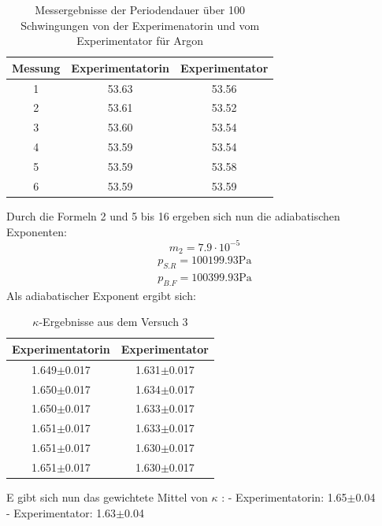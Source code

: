 \documentclass[bibliography=totocnumbered]{scrartcl}
\begin{document}
	\begin{table}[ht!]
		\centering
		\caption{Messergebnisse der Periodendauer über 100 Schwingungen von der Experimenatorin und vom Experimentator für Argon}
		\begin{tabular}{|c|c|c|}
			\hline
			Messung & Experimentatorin & Experimentator \\
			\hline
			1 & 53.63 & 53.56 \\
			\hline
			2 & 53.61 & 53.52 \\
			\hline
			3 & 53.60 & 53.54 \\
			\hline
			4 & 53.59 & 53.54 \\
			\hline
			5 & 53.59 & 53.58 \\
			\hline
			6 & 53.59 & 53.59 \\
			\hline
		\end{tabular}
		\label{tab: M.ergebnisse A3 T100}
	\end{table}
	Durch die Formeln 2 und 5 bis 16 ergeben sich nun die adiabatischen Exponenten:\\
	\begin{equation}\label{eq: Masse 2 Argon}
		m_{2}=7.9\cdot 10^{-5}
	\end{equation}
\begin{align}\label{eq: Druck}
	p_{S.R}=100199.93\text{Pa}\\
	p_{B.F}=100399.93\text{Pa}
\end{align}
	Als adiabatischer Exponent ergibt sich:\\
	\begin{table}[ht!]
		\centering
		\caption{$\kappa$-Ergebnisse aus dem Versuch 3}
		\begin{tabular}{|c|c|}
			\hline
			Experimentatorin  & Experimentator \\
			\hline
			1.649$ \pm $0.017& 1.631$ \pm $0.017 \\
			\hline
			1.650$ \pm $0.017 & 1.634$ \pm $0.017 \\
			\hline
			1.650$ \pm $0.017 & 1.633$ \pm $0.017 \\
			\hline
			1.651$ \pm $0.017 & 1.633$ \pm $0.017 \\
			\hline
			1.651$ \pm $0.017 & 1.630$ \pm $0.017 \\
			\hline
			1.651$ \pm $0.017 & 1.630$ \pm $0.017 \\
			\hline
		\end{tabular}
		\label{tab: kappa V3}
	\end{table}
	
	E gibt sich nun das gewichtete Mittel von $\kappa$ :
	- Experimentatorin: 1.65$\pm$0.04\\
	- Experimentator: 1.63$\pm$0.04
	\newpage
\end{document}
